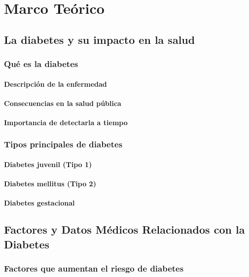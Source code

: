 \chapter{Marco Te\'orico}

\section{La diabetes y su impacto en la salud}

\subsection{Qu\'e es la diabetes}
\subsubsection{Descripci\'on de la enfermedad}
\subsubsection{Consecuencias en la salud p\'ublica}
\subsubsection{Importancia de detectarla a tiempo}

\subsection{Tipos principales de diabetes}
\subsubsection{Diabetes juvenil (Tipo 1)}
\subsubsection{Diabetes mellitus (Tipo 2)}
\subsubsection{Diabetes gestacional}

\section{Factores y Datos M\'edicos Relacionados con la Diabetes}

\subsection{Factores que aumentan el riesgo de diabetes}
